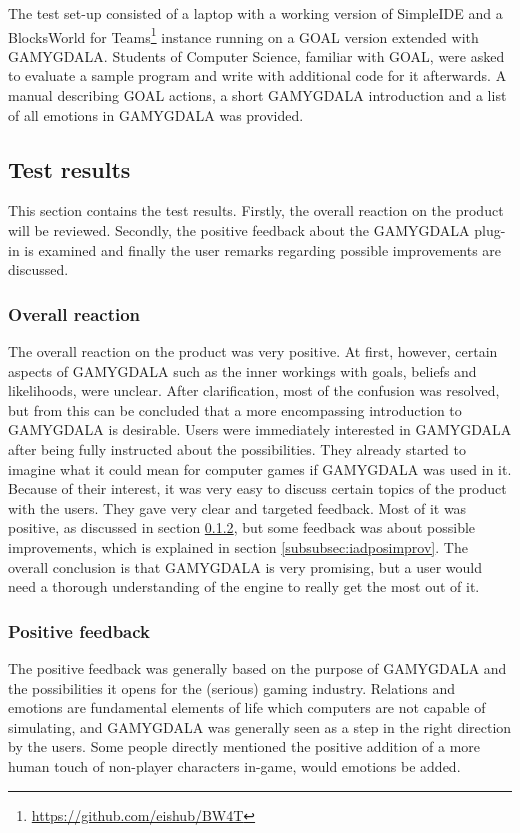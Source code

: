 The test set-up consisted of a laptop with a working version of SimpleIDE and a BlocksWorld for Teams\footnote{\url{https://github.com/eishub/BW4T}} instance running on a GOAL version extended with GAMYGDALA. Students of Computer Science, familiar with GOAL, were asked to evaluate a sample program and write with additional code for it afterwards. A manual describing GOAL actions, a short GAMYGDALA introduction and a list of all emotions in GAMYGDALA was provided. \clearpage

\subsection{Test results}
\label{subsec:iadres}
This section contains the test results. Firstly, the overall reaction on the product will be reviewed. Secondly, the positive feedback about the GAMYGDALA plug-in is examined and finally the user remarks regarding possible improvements are discussed.

\subsubsection{Overall reaction}
The overall reaction on the product was very positive. At first, however, certain aspects of GAMYGDALA such as the inner workings with goals, beliefs and likelihoods, were unclear. After clarification, most of the confusion was resolved, but from this can be concluded that a more encompassing introduction to GAMYGDALA is desirable. Users were immediately interested in GAMYGDALA after being fully instructed about the possibilities. They already started to imagine what it could mean for computer games if GAMYGDALA was used in it. Because of their interest, it was very easy to discuss certain topics of the product with the users. They gave very clear and targeted feedback.  Most of it was positive, as discussed in section \ref{subsubsec:iadposfeedb}, but some feedback was about possible improvements, which is explained in section \ref{subsubsec:iadposimprov}. The overall conclusion is that GAMYGDALA is very promising, but a user would need a thorough understanding of the engine to really get the most out of it.

\subsubsection{Positive feedback}
\label{subsubsec:iadposfeedb}
The positive feedback was generally based on the purpose of GAMYGDALA and the possibilities it opens for the (serious) gaming industry. Relations and emotions are fundamental elements of life which computers are not capable of simulating, and GAMYGDALA was generally seen as a step in the right direction by the users. Some people directly mentioned the positive addition of a more human touch of non-player characters in-game, would emotions be added.\\

